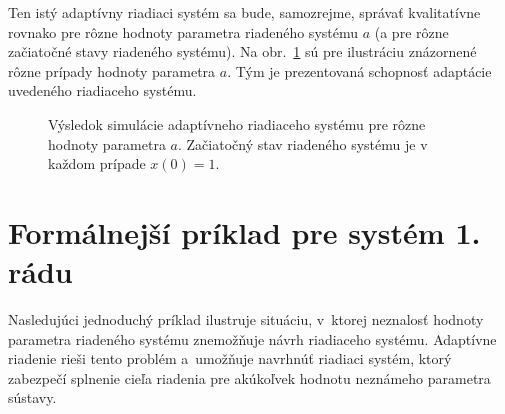\documentclass[a4paper, 10pt, ]{article}
\begin{document}
Ten istý adaptívny riadiaci systém sa bude, samozrejme, správať kvalitatívne rovnako pre rôzne hodnoty parametra riadeného systému $a$ (a pre rôzne začiatočné stavy riadeného systému). Na obr.~\ref{Výsledok numerickej simulácie adapt systému pripady} sú pre ilustráciu znázornené rôzne prípady hodnoty parametra $a$. Tým je prezentovaná schopnosť adaptácie uvedeného riadiaceho systému.





\begin{figure}[t]
	\centering
	\caption{Výsledok simulácie adaptívneho riadiaceho systému pre rôzne hodnoty parametra $a$. Začiatočný stav riadeného systému je v každom prípade $x(0) = 1$.}
	\label{Výsledok numerickej simulácie adapt systému pripady}
\end{figure}













\section{Formálnejší príklad pre systém 1. rádu}



Nasledujúci jednoduchý príklad ilustruje situáciu, v~ktorej neznalosť hodnoty parametra riadeného systému znemožňuje návrh riadiaceho systému. Adaptívne riadenie rieši tento problém a~umožňuje navrhnúť riadiaci systém, ktorý zabezpečí splnenie cieľa riadenia pre akúkoľvek hodnotu neznámeho parametra sústavy.
\end{document}
